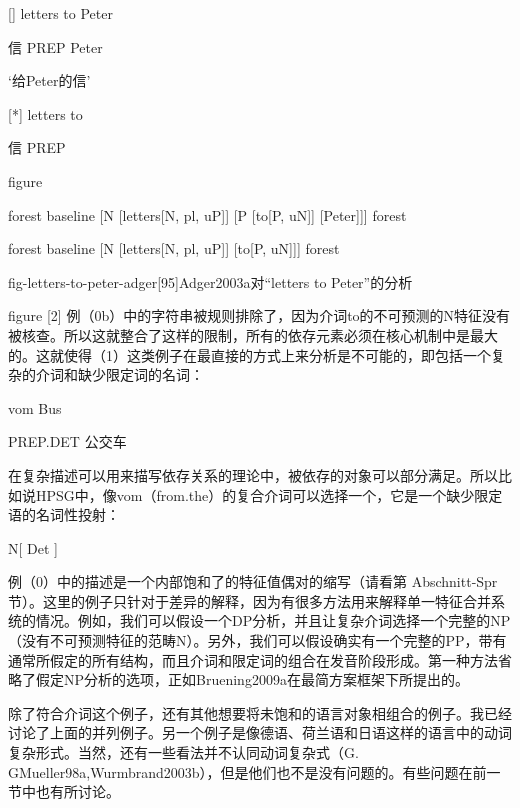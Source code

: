 []
letters to Peter

信 PREP Peter

`给Peter的信'

[*]
letters to

信 PREP



figure

forest
baseline
[N 
  [letters[N, pl, uP]]
  [P
    [to[P, uN]]
    [Peter]]]
forest

forest
baseline
[N 
  [letters[N, pl, uP]]
  [to[P, uN]]]
forest

fig-letters-to-peter-adger[95]Adger2003a对“letters to Peter”的分析

figure
[2]
例（0b）中的字符串被规则排除了，因为介词to的不可预测的N特征没有被核查。所以这就整合了这样的限制，所有的依存元素必须在核心机制中是最大的。这就使得（1）这类例子在最直接的方式上来分析是不可能的，即包括一个复杂的介词和缺少限定词的名词：






vom Bus

     PREP.DET 公交车



在复杂描述可以用来描写依存关系的理论中，被依存的对象可以部分满足。所以比如说HPSG中，像vom（from.the）的复合介词可以选择一个，它是一个缺少限定语的名词性投射：




N[ Det ]

例（0）中的描述是一个内部饱和了的特征值偶对的缩写（请看第 Abschnitt-Spr节）。这里的例子只针对于差异的解释，因为有很多方法用来解释单一特征合并系统的情况。例如，我们可以假设一个DP分析，并且让复杂介词选择一个完整的NP（没有不可预测特征的范畴N）。另外，我们可以假设确实有一个完整的PP，带有通常所假定的所有结构，而且介词和限定词的组合在发音阶段形成。第一种方法省略了假定NP分析的选项，正如Bruening2009a在最简方案框架下所提出的。









除了符合介词这个例子，还有其他想要将未饱和的语言对象相组合的例子。我已经讨论了上面的并列例子。另一个例子是像德语、荷兰语和日语这样的语言中的动词复杂形式。当然，还有一些看法并不认同动词复杂式（G. GMueller98a,Wurmbrand2003b），但是他们也不是没有问题的。有些问题在前一节中也有所讨论。









